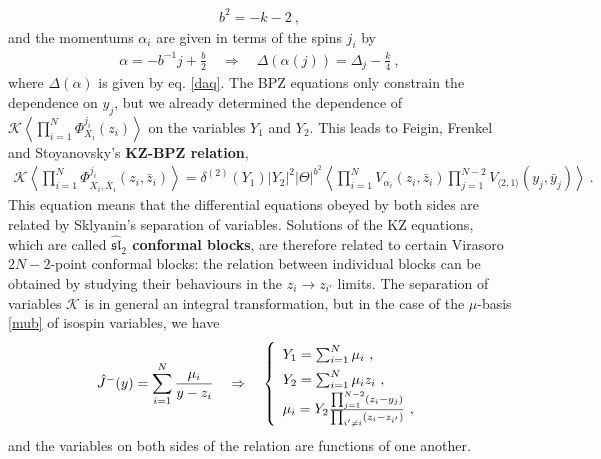 \documentclass[12pt,a4paper,notitlepage]{report}
\numberwithin{equation}{section}
\theoremstyle{break}
\begin{document}
\begin{align}
 \boxed{ b^2 = -k-2}\ ,
\label{bk}
\end{align}
and the momentums $\alpha_i$ are given in terms of the spins $j_i$ by 
\begin{align}
 \boxed{\alpha = -b^{-1}j+\frac{b}{2}}\quad \Rightarrow \quad \boxed{\Delta(\alpha(j)) = \Delta_j-\frac{k}{4}}\ ,
\label{aj}
\end{align}
where $\Delta(\alpha)$ is given by eq. \eqref{daq}.
The BPZ equations only constrain the dependence on $y_j$, but we already determined the dependence of  
$\mathcal{K}\left\langle \prod_{i=1}^N \Phi^{j_i}_{X_i}(z_i)\right\rangle$ on the variables $Y_1$ and $Y_2$.
This leads to Feigin, Frenkel and Stoyanovsky's \textbf{\boldmath KZ-BPZ relation},
\begin{align}
 \boxed{ \mathcal{K}\left\langle \prod_{i=1}^N \Phi^{j_i}_{X_i,\bar{X}_i}(z_i,\bar{z}_i)\right\rangle = \delta^{(2)}(Y_1) |Y_2|^2 |\Theta|^{b^2} \left\langle \prod_{i=1}^N V_{\alpha_i}(z_i,\bar{z}_i)\prod_{j=1}^{N-2}V_{\langle 2,1\rangle}(y_j,\bar{y}_j)\right\rangle}\ .
\label{dyy}
\end{align}
This equation means that the differential equations obeyed by both sides are related by Sklyanin's separation of variables. 
Solutions of the KZ equations, which are called \textbf{\boldmath $\widehat{\mathfrak{sl}}_2$ conformal blocks}, are therefore related to certain Virasoro $2N-2$-point conformal blocks: the relation between individual blocks can be obtained by studying their behaviours in the $z_i\rightarrow z_{i'}$ limits.
The separation of variables $\mathcal{K}$ is in general an integral transformation, but in the case of the $\mu$-basis \eqref{mub} of isospin variables, we have 
\begin{align}
\renewcommand{\arraystretch}{1.5}
 \hat{J}^-(y) = \sum_{i=1}^N \frac{\mu_i}{y-z_i} \quad \Rightarrow \quad \left\{\begin{array}{l}  Y_1 =\sum_{i=1}^N \mu_i\ , \\ Y_2 = \sum_{i=1}^N \mu_i z_i\ , \\ \mu_i = Y_2\frac{\prod_{j=1}^{N-2}(z_i-y_j)}{\prod_{i'\neq i}(z_i-z_{i'})}\ ,\end{array}\right. 
\label{my}
\end{align}
and the variables on both sides of the relation are functions of one another. 
\end{document}
